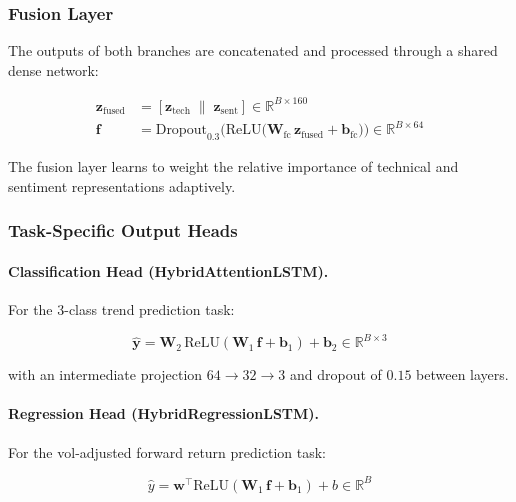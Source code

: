 \subsubsection{Fusion Layer}

The outputs of both branches are concatenated and processed through a shared
dense network:

\begin{align}
  \mathbf{z}_{\text{fused}} &= [\mathbf{z}_{\text{tech}} \;\|\;
    \mathbf{z}_{\text{sent}}]
    \in \mathbb{R}^{B \times 160} \\
  \mathbf{f} &= \text{Dropout}_{0.3}\bigl(\text{ReLU}\bigl(
    \mathbf{W}_{\text{fc}}\, \mathbf{z}_{\text{fused}} + \mathbf{b}_{\text{fc}}
    \bigr)\bigr)
    \in \mathbb{R}^{B \times 64}
\end{align}

The fusion layer learns to weight the relative importance of technical and
sentiment representations adaptively.

\subsubsection{Task-Specific Output Heads}

\paragraph{Classification Head (HybridAttentionLSTM).}
For the 3-class trend prediction task:

\begin{equation}
  \hat{\mathbf{y}} = \mathbf{W}_2\, \text{ReLU}(\mathbf{W}_1\, \mathbf{f} +
    \mathbf{b}_1) + \mathbf{b}_2
    \in \mathbb{R}^{B \times 3}
    \label{eq:cls-head}
\end{equation}

with an intermediate projection $64 \to 32 \to 3$ and dropout of $0.15$ between
layers.

\paragraph{Regression Head (HybridRegressionLSTM).}
For the vol-adjusted forward return prediction task:

\begin{equation}
  \hat{y} = \mathbf{w}^\top \text{ReLU}(\mathbf{W}_1\, \mathbf{f} +
    \mathbf{b}_1) + b
    \in \mathbb{R}^{B}
    \label{eq:reg-head}
\end{equation}

